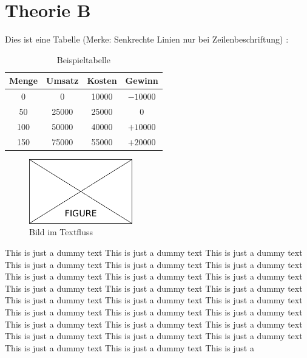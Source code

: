 \section{Theorie B}
\label{sec:theorieB}

Dies ist eine Tabelle (Merke: Senkrechte Linien nur bei Zeilenbeschriftung)  :

\medskip
\begin{table}[H]
	\centering
	{\renewcommand{\arraystretch}{1.5}
		\begin{tabular}{cccc}
			\toprule 
			Menge & Umsatz & Kosten & Gewinn \\ \midrule 
			0 & 0 & 10000 & $-10000$ \\ %
			50 & 25000 & 25000 & 0 \\ %
			100 & 50000 & 40000 & $+10000$ \\ %
			150 & 75000 & 55000 & $+20000$ \\
			\bottomrule 
		\end{tabular}
	}
	\caption{Beispieltabelle}
	\label{tab:BSP}
\end{table}

\begin{figure}
	\centering
	\includegraphics[width=0.4\textwidth]{Content/Figures/figure.png}
	\caption{Bild im Textfluss}
	\label{fig:test}
\end{figure}

This is just a dummy text This is just a dummy text This is just a dummy text This is just a dummy text This is just a dummy text This is just a dummy text
This is just a dummy text This is just a dummy text This is just a dummy text This is just a dummy text This is just a dummy text This is just a dummy text This is just a dummy text This is just a dummy text This is just a dummy text This is just a dummy text This is just a dummy text This is just a dummy text This is just a dummy text This is just a dummy text This is just a dummy text This is just a dummy text This is just a dummy text This is just a dummy text This is just a dummy text This is just a dummy text This is just a

